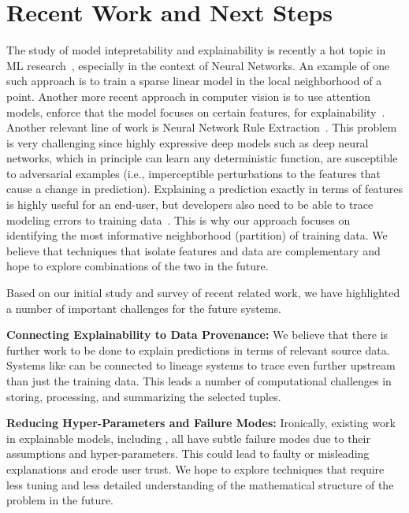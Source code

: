 \section{Recent Work and Next Steps}
The study of model intepretability and explainability is recently a hot topic in ML research~\cite{taylor2016alignment, lei2016rationalizing, ribeiro2016should}, especially in the context of Neural Networks. 
An example of one such approach is to train a sparse linear model in the local neighborhood of a point\cite{lei2016rationalizing}.
Another more recent approach in computer vision is to use attention models, enforce that the model focuses on certain features, for explainability~\cite{kim2017interpretable}.
Another relevant line of work is Neural Network Rule Extraction~\cite{hailesilassie2016rule}.
This problem is very challenging since highly expressive deep models such as deep neural networks, which in principle can learn any deterministic function, are susceptible to adversarial examples (i.e., imperceptible perturbations to the features that cause a change in prediction)\cite{szegedy2013intriguing}.
Explaining a prediction exactly in terms of features is highly useful for an end-user, but developers also need to be able to trace modeling errors to training data~\cite{DBLP:journals/pvldb/KrishnanWWFG16}.
This is why our approach focuses on identifying the most informative neighborhood (partition) of training data.
We believe that techniques that isolate features and data are complementary and hope to explore combinations of the two in the future.

Based on our initial study and survey of recent related work, we have highlighted a number of important challenges for the future systems.

\vspace{0.5em}\noindent\textbf{Connecting Explainability to Data Provenance: } We believe that there is further work to be done to explain predictions in terms of relevant source data. Systems like \sys can be connected to lineage systems to trace even further upstream than just the training data. This leads a number of computational challenges in storing, processing, and summarizing the selected tuples.

\vspace{0.5em}\noindent\textbf{Reducing Hyper-Parameters and Failure Modes: } Ironically, existing work in explainable models, including \sys, all have subtle failure modes due to their assumptions and hyper-parameters. This could lead to faulty or misleading explanations and erode user trust. We hope to explore techniques that require less tuning and less detailed understanding of the mathematical structure of the problem in the future.

